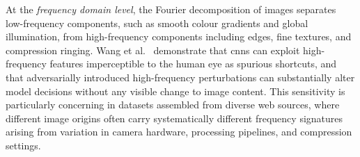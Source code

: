 
At the \emph{frequency domain level}, the Fourier decomposition of images separates
low-frequency components, such as smooth colour gradients and global illumination, from
high-frequency components including edges, fine textures, and compression ringing. Wang et
al.~\cite{Wang_2020_HighFrequencyComponentHelpsExplainTheGeneralizationOfCNN} demonstrate
that \acrshort{cnn}s can exploit high-frequency features imperceptible to the human eye as
spurious shortcuts, and that adversarially introduced high-frequency perturbations can
substantially alter model decisions without any visible change to image content. This
sensitivity is particularly concerning in datasets assembled from diverse web sources, where
different image origins often carry systematically different frequency signatures arising from
variation in camera hardware, processing pipelines, and compression settings.


